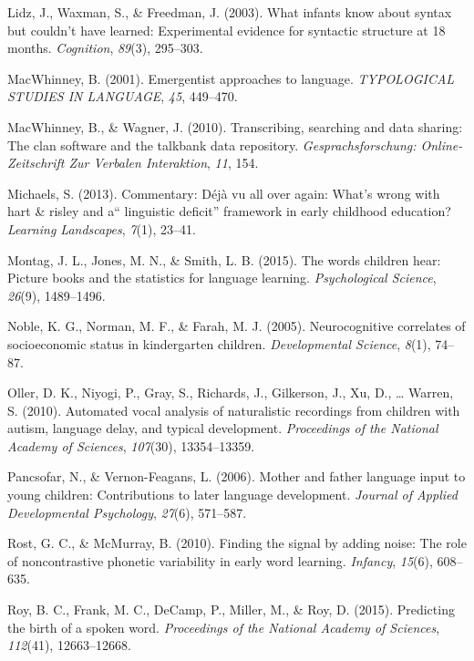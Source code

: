 \documentclass[floatsintext,man]{apa6}
\theoremstyle{definition}
\theoremstyle{definition}
\theoremstyle{definition}
\theoremstyle{remark}
\begin{document}
\hypertarget{ref-lidz2003infants}{}
Lidz, J., Waxman, S., \& Freedman, J. (2003). What infants know about
syntax but couldn't have learned: Experimental evidence for syntactic
structure at 18 months. \emph{Cognition}, \emph{89}(3), 295--303.

\hypertarget{ref-macwhinney2001emergentist}{}
MacWhinney, B. (2001). Emergentist approaches to language.
\emph{TYPOLOGICAL STUDIES IN LANGUAGE}, \emph{45}, 449--470.

\hypertarget{ref-macwhinney2010transcribing}{}
MacWhinney, B., \& Wagner, J. (2010). Transcribing, searching and data
sharing: The clan software and the talkbank data repository.
\emph{Gesprachsforschung: Online-Zeitschrift Zur Verbalen Interaktion},
\emph{11}, 154.

\hypertarget{ref-michaels2013commentary}{}
Michaels, S. (2013). Commentary: Déjà vu all over again: What's wrong
with hart \& risley and a`` linguistic deficit'' framework in early
childhood education? \emph{Learning Landscapes}, \emph{7}(1), 23--41.

\hypertarget{ref-montag2015words}{}
Montag, J. L., Jones, M. N., \& Smith, L. B. (2015). The words children
hear: Picture books and the statistics for language learning.
\emph{Psychological Science}, \emph{26}(9), 1489--1496.

\hypertarget{ref-noble2005neurocognitive}{}
Noble, K. G., Norman, M. F., \& Farah, M. J. (2005). Neurocognitive
correlates of socioeconomic status in kindergarten children.
\emph{Developmental Science}, \emph{8}(1), 74--87.

\hypertarget{ref-oller2010automated}{}
Oller, D. K., Niyogi, P., Gray, S., Richards, J., Gilkerson, J., Xu, D.,
\ldots{} Warren, S. (2010). Automated vocal analysis of naturalistic
recordings from children with autism, language delay, and typical
development. \emph{Proceedings of the National Academy of Sciences},
\emph{107}(30), 13354--13359.

\hypertarget{ref-pancsofar2006mother}{}
Pancsofar, N., \& Vernon-Feagans, L. (2006). Mother and father language
input to young children: Contributions to later language development.
\emph{Journal of Applied Developmental Psychology}, \emph{27}(6),
571--587.

\hypertarget{ref-rost2010finding}{}
Rost, G. C., \& McMurray, B. (2010). Finding the signal by adding noise:
The role of noncontrastive phonetic variability in early word learning.
\emph{Infancy}, \emph{15}(6), 608--635.

\hypertarget{ref-roy2015predicting}{}
Roy, B. C., Frank, M. C., DeCamp, P., Miller, M., \& Roy, D. (2015).
Predicting the birth of a spoken word. \emph{Proceedings of the National
Academy of Sciences}, \emph{112}(41), 12663--12668.
\end{document}
